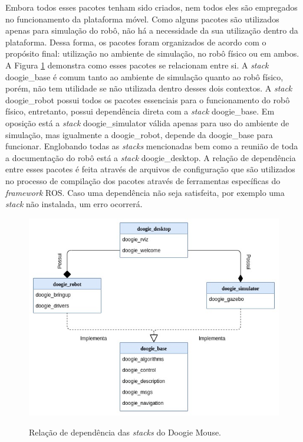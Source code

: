 Embora todos esses pacotes tenham sido criados, nem todos eles são empregados no funcionamento da plataforma móvel. Como alguns pacotes são utilizados apenas para simulação do robô, não há a necessidade da sua utilização dentro da plataforma. Dessa forma, os pacotes foram organizados de acordo com o propósito final: utilização no ambiente de simulação, no robô físico ou em ambos. A Figura \ref{fig:diagrama_dos_pacotes} demonstra como esses pacotes se relacionam entre si. A \textit{stack} doogie\_base é comum tanto ao ambiente de simulação quanto ao robô físico, porém, não tem utilidade se não utilizada dentro desses dois contextos. A \textit{stack} doogie\_robot possui todos os pacotes essenciais para o funcionamento do robô físico, entretanto, possui dependência direta com a \textit{stack} doogie\_base. Em oposição está a \textit{stack} doogie\_simulator válida apenas para uso do ambiente de simulação, mas igualmente a doogie\_robot, depende da doogie\_base para funcionar. Englobando todas as \textit{stacks} mencionadas bem como a reunião de toda a documentação do robô está a \textit{stack} doogie\_desktop. A relação de dependência entre esses pacotes é feita através de arquivos de configuração que são utilizados no processo de compilação dos pacotes através de ferramentas específicas do \textit{framework} ROS. Caso uma dependência não seja satisfeita, por exemplo uma \textit{stack} não instalada, um erro ocorrerá.   

\begin{figure}[H]
	\centering
	\caption{Relação de dependência das \textit{stacks} do Doogie Mouse.}
	\includegraphics[width=1\textwidth]
	{Figures/diagrama_dos_pacotes}
	\label{fig:diagrama_dos_pacotes}
\end{figure}

